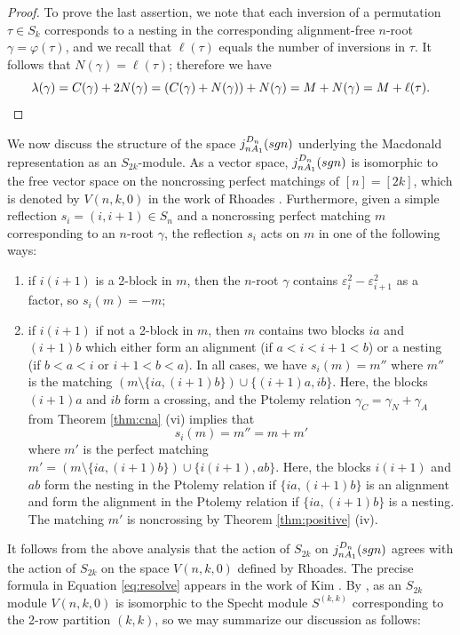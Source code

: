\documentclass[11pt]{amsart}
\theoremstyle{plain}
\theoremstyle{definition}
\theoremstyle{remark}
\numberwithin{equation}{subsection}
\newcommand{\ep}{\varepsilon}
\newcommand{\macd}[2]{j^{#1}_{#2}({\rm{sgn}})}
\begin{document}
\begin{proof}
To prove the last assertion, we note that each inversion of a permutation
$\tau\in S_k$ corresponds to a nesting in the corresponding alignment-free
$n$-root $\gamma=\varphi(\tau)$, and we recall that $\ell(\tau)$ equals the number
of inversions in $\tau$. It follows that $N(\gamma)=\ell(\tau)$; therefore we have
\[ \lambda(\gamma)=C(\gamma)+2
N(\gamma)=(C(\gamma)+N(\gamma))+N(\gamma)=M+N(\gamma)=M+\ell(\tau).\qedhere \]
\end{proof}

We now discuss the structure of the space  $\macd{D_n}{nA_1}$ underlying the
Macdonald representation as an $S_{2k}$-module. As a vector space,
$\macd{D_n}{nA_1}$ is isomorphic to the free vector space on the noncrossing
perfect matchings of $[n]=[2k]$, which is denoted by $V(n,k,0)$ in the work of
Rhoades \cite{rhoades17}. Furthermore, given a simple reflection $s_i=(i,i+1)\in
S_{n}$ and a noncrossing perfect matching $m$ corresponding to an $n$-root
$\gamma$, the reflection $s_i$ acts on $m$ in one of the following ways:
\begin{enumerate}
    \item[\rm{(1)}] if $i(i+1)$ is a 2-block in $m$, then the $n$-root $\gamma$ contains
         $\ep_i^2-\ep_{i+1}^2$ as a factor, so $s_i(m)=-m$;
     \item[\rm{(2)}] if $i(i+1)$ if not a 2-block in $m$, then $m$ contains two blocks
         $ia$ and $(i+1)b$ which either form an alignment (if $a<i<i+1<b$) or a
         nesting (if $b<a<i$ or $i+1<b<a$). In all cases, we have $s_i(m)=m''$
         where $m''$ is the matching
         $(m\setminus\{ia,(i+1)b\})\cup\{(i+1)a,ib\}$. Here, the blocks $(i+1)a$
         and $ib$ form a crossing, and  the Ptolemy relation
         $\gamma_C=\gamma_N+\gamma_A$ from Theorem \ref{thm:cna} (vi) implies
         that
         \begin{equation}
             \label{eq:resolve} s_i(m)=m''=m+m'
         \end{equation} where $m'$ is the perfect matching $m'=(m\setminus
     \{ia,(i+1)b\}) \cup \{i(i+1),ab\}$. Here, the blocks $i(i+1)$ and $ab$ form
     the nesting in the Ptolemy relation if $\{ia, (i+1)b\}$ is an alignment and
     form the alignment in the Ptolemy relation if  $\{ia, (i+1)b\}$ is a
     nesting. The matching $m'$ is noncrossing by Theorem \ref{thm:positive}
     (iv).
 \end{enumerate}
 It follows from the above analysis that the action of $S_{2k}$ on
 $\macd{D_n}{nA_1}$ agrees with the action of $S_{2k}$ on the space $V(n,k,0)$
 defined by Rhoades. The precise formula in Equation \eqref{eq:resolve} appears
 in the work of Kim \cite[Equation (1.3)]{kim24}.  By \cite[Proposition
 5.2]{rhoades17}, as an $S_{2k}$ module $V(n,k,0)$ is isomorphic to the Specht
 module $S^{(k,k)}$ corresponding to the 2-row partition $(k,k)$, so we may
 summarize our discussion as follows:
\end{document}
